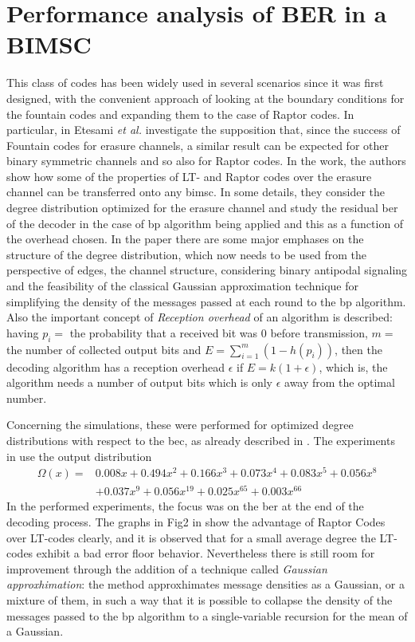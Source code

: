 \section{Performance analysis of BER in a BIMSC}
This class of codes has been widely used in several scenarios since it was first designed, with the convenient approach of looking at the boundary conditions for the fountain codes and expanding them to the case of Raptor codes. In particular, in \cite{Etesami2006} Etesami \textit{et al.} investigate the supposition that, since the success of Fountain codes for erasure channels, a similar result can be expected for other binary symmetric channels and so also for Raptor codes. In the work, the authors show how some of the properties of LT- and Raptor codes over the erasure channel can be transferred onto any \gls{bimsc}. In some details, they consider the degree distribution optimized for the erasure channel and study the residual \gls{ber} of the decoder in the case of \gls{bp} algorithm being applied and this as a function of the overhead chosen. In the paper there are some major emphases on the structure of the degree distribution, which now needs to be used from the perspective of edges, the channel structure, considering binary antipodal signaling and the feasibility of the classical Gaussian approximation technique for simplifying the density of the messages passed at each round to the \gls{bp} algorithm. Also the important concept of \textit{Reception overhead} of an algorithm is described: having $p_i = $ the probability that a received bit was $0$ before transmission, $m =$ the number of collected output bits and $E = \sum_{i=1}^m(1-h(p_i))$, then the decoding algorithm has a reception overhead $\epsilon$ if $E = k(1+\epsilon)$, which is, the algorithm needs a number of output bits which is only $\epsilon$ away from the optimal number.

Concerning the simulations, these were performed for optimized degree distributions with respect to the \gls{bec}, as already described in \cite{Shokrollahi2006}. The experiments in \cite{Etesami2006} use the output distribution
\begin{align}
  \Omega(x) =&0.008x + 0.494x^2 + 0.166x^3 + 0.073x^4 + 0.083x^5 + 0.056x^8\\
             &+ 0.037x^9 + 0.056x^{19} + 0.025x^{65} + 0.003x^{66}
\end{align}
In the performed experiments, the focus was on the \gls{ber} at the end of the decoding process. The graphs in Fig2 in \cite{Etesami2006} show the advantage of Raptor Codes over LT-codes clearly, and it is observed that for a small average degree the LT-codes exhibit a bad error floor behavior. Nevertheless there is still room for improvement through the addition of a technique called \textit{Gaussian approxhimation}: the method approxhimates message densities as a Gaussian, or a mixture of them, in such a way that it is possible to collapse the density of the messages passed to the \gls{bp} algorithm to a single-variable recursion for the mean of a Gaussian.
